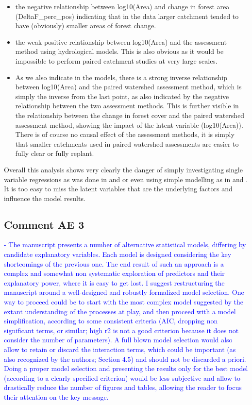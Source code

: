 \documentclass[]{elsarticle} %
\providecommand{\tightlist}{%
  \setlength{\itemsep}{0pt}\setlength{\parskip}{0pt}}
\begin{document}
\begin{itemize}
\tightlist
\item
  the negative relationship between log10(Area) and change in forest area (DeltaF\_perc\_pos) indicating that in the data larger catchment tended to have (obviously) smaller areas of forest change.
\item
  the weak positive relationship between log10(Area) and the assessment method using hydrological models. This is also obvious as it would be impossible to perform paired catchment studies at very large scales.
\item
  As we also indicate in the models, there is a strong inverse relationship between log10(Area) and the paired watershed assessment method, which is simply the inverse from the last point, as also indicated by the negative relationship between the two assessment methods. This is further visible in the relationship between the change in forest cover and the paired watershed assessment method, showing the impact of the latent variable (log10(Area)). There is of course no causal effect of the assessment methods, it is simply that smaller catchments used in paired watershed assessments are easier to fully clear or fully replant.
\end{itemize}

Overall this analysis shows very clearly the danger of simply investigating single variable regressions as was done in \citet{zhang2017} and \citet{filoso2017} or even using simple modelling as in \citet{jackson2005} and \citet{zhou2015}. It is too easy to miss the latent variables that are the underlying factors and influence the model results.

\hypertarget{comment-ae-3}{%
\subsection{Comment AE 3}\label{comment-ae-3}}

\textcolor{blue}{- The manuscript presents a number of alternative statistical models, differing by candidate explanatory variables. Each model is designed considering the key shortcomings of the previous one. The end result of such an approach is a complex and somewhat non systematic exploration of predictors and their explanatory power, where it is easy to get lost. I suggest restructuring the manuscript around a well-designed and robustly formalized model selection. One way to proceed could be to start with the most complex model suggested by the extant understanding of the processes at play, and then proceed with a model simplification, according to some consistent criteria (AIC, dropping non significant terms, or similar; high r2 is not a good criterion because it does not consider the number of parameters). A full blown model selection would also allow to retain or discard the interaction terms, which could be important (as also recognized by the authors; Section 4.5) and should not be discarded a priori. Doing a proper model selection and presenting the results only for the best model (according to a clearly specified criterion) would be less subjective and allow to drastically reduce the number of figures and tables, allowing the reader to focus their attention on the key message.}
\end{document}
